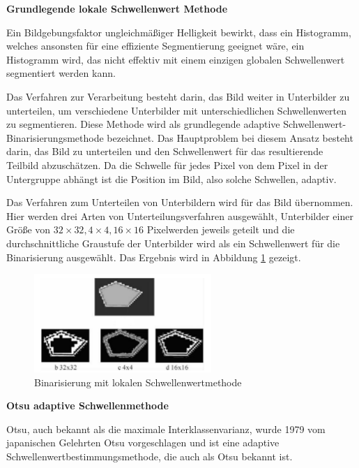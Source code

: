 \textbf{Grundlegende lokale Schwellenwert Methode}

Ein Bildgebungsfaktor ungleichmäßiger Helligkeit bewirkt, dass ein Histogramm, welches ansonsten für eine effiziente Segmentierung geeignet wäre, ein Histogramm wird, das nicht effektiv mit einem einzigen globalen Schwellenwert segmentiert werden kann.

Das Verfahren zur Verarbeitung besteht darin, das Bild weiter in Unterbilder zu unterteilen, um verschiedene Unterbilder mit unterschiedlichen Schwellenwerten zu segmentieren. Diese Methode wird als grundlegende adaptive Schwellenwert-Binarisierungsmethode bezeichnet. Das Hauptproblem bei diesem Ansatz besteht darin, das Bild zu unterteilen und den Schwellenwert für das resultierende Teilbild abzuschätzen. Da die Schwelle für jedes Pixel von dem Pixel in der Untergruppe abhängt ist die Position im Bild, also solche Schwellen, adaptiv. 

Das Verfahren zum Unterteilen von Unterbildern wird für das Bild übernommen. Hier werden drei Arten von Unterteilungsverfahren ausgewählt, Unterbilder einer Größe von $ 32\times32,4 \times4,16\times16 $ Pixelwerden jeweils geteilt und die durchschnittliche Graustufe der Unterbilder wird als ein Schwellenwert für die Binarisierung ausgewählt. Das Ergebnis wird in Abbildung \ref{fig:Binarisierung mit lokalen Schwellenwertmethode} gezeigt.

\begin{figure}[H]
 \centering 
  \includegraphics[keepaspectratio,width=0.6\textwidth]{images/4_ZweiteErfahrung/Binar/adaptive.pdf}
 \caption{Binarisierung mit lokalen Schwellenwertmethode}
 \label{fig:Binarisierung mit lokalen Schwellenwertmethode}
\end{figure} 

\textbf{Otsu adaptive Schwellenmethode}

Otsu\cite{Ostu}, auch bekannt als die maximale Interklassenvarianz, wurde 1979 vom japanischen Gelehrten Otsu vorgeschlagen und ist eine adaptive Schwellenwertbestimmungsmethode, die auch als Otsu bekannt ist.

